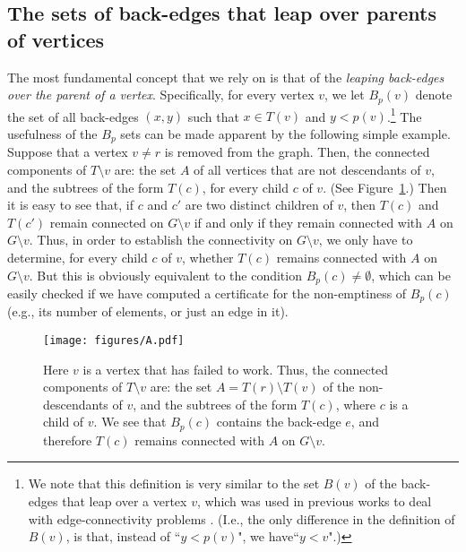 \documentclass[11pt,a4paper]{article}
\begin{document}
\subsection{The sets of back-edges that leap over parents of vertices}
The most fundamental concept that we rely on is that of the \emph{leaping back-edges over the parent of a vertex}. Specifically, for every vertex $v$, we let $B_p(v)$ denote the set of all back-edges $(x,y)$ such that $x\in T(v)$ and $y<p(v)$.\footnote{We note that this definition is very similar to the set $B(v)$ of the back-edges that leap over a vertex $v$, which was used in previous works to deal with edge-connectivity problems \cite{DBLP:conf/esa/NadaraRSS21,DBLP:conf/esa/GeorgiadisIK21,DBLP:conf/soda/Kosinas24}. (I.e., the only difference in the definition of $B(v)$, is that, instead of ``$y<p(v)$", we have``$y<v$".)} The usefulness of the $B_p$ sets can be made apparent by the following simple example. Suppose that a vertex $v\neq r$ is removed from the graph. Then, the connected components of $T\setminus{v}$ are: the set $A$ of all vertices that are not descendants of $v$, and the subtrees of the form $T(c)$, for every child $c$ of $v$. (See Figure~\ref{figure:A}.) Then it is easy to see that, if $c$ and $c'$ are two distinct children of $v$, then $T(c)$ and $T(c')$ remain connected on $G\setminus{v}$ if and only if they remain connected with $A$ on $G\setminus{v}$. Thus, in order to establish the connectivity on $G\setminus{v}$, we only have to determine, for every child $c$ of $v$, whether $T(c)$ remains connected with $A$ on $G\setminus{v}$. But this is obviously equivalent to the condition $B_p(c)\neq\emptyset$, which can be easily checked if we have computed a certificate for the non-emptiness of $B_p(c)$ (e.g., its number of elements, or just an edge in it). 

\begin{figure}[h!]\centering
\texttt{[image: figures/A.pdf]}
\caption{\small{Here $v$ is a vertex that has failed to work. Thus, the connected components of $T\setminus{v}$ are: the set $A=T(r)\setminus T(v)$ of the non-descendants of $v$, and the subtrees of the form $T(c)$, where $c$ is a child of $v$. We see that $B_p(c)$ contains the back-edge $e$, and therefore $T(c)$ remains connected with $A$ on $G\setminus{v}$.}}\label{figure:A}
\end{figure}  
\end{document}
